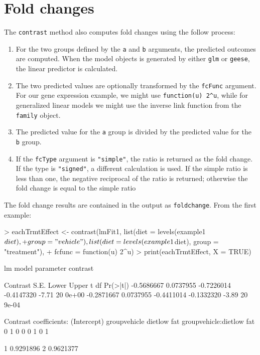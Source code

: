 \documentclass[12pt]{article}
\begin{document}
\section{Fold changes}

The \texttt{contrast} method also computes fold changes using the follow process:

\begin{enumerate}
\item For the two groups defined by the \texttt{a} and \texttt{b} arguments, the predicted outcomes are computed. When the model objects is generated by either \texttt{glm} or \texttt{geese}, the linear predictor is calculated.
\item The two predicted values are optionally transformed by the \texttt{fcFunc} argument. For our gene expression example, we might use \verb+function(u) 2^u+, while for generalized linear models we might use the inverse link function from the \texttt{family} object. 
\item The predicted value for the \texttt{a} group is divided by the predicted value for the \texttt{b} group.
\item If the \texttt{fcType} argument is \texttt{"simple"}, the ratio is returned as the fold change. If the type is \texttt{"signed"}, a different calculation is used. If the simple ratio is less than one, the negative reciprocal of the ratio is returned; otherwise the fold change is equal to the simple ratio
\end{enumerate}

The fold change results are contained in the output as \texttt{foldchange}. From the first example:

{\small
\begin{Schunk}
\begin{Sinput}
> eachTrmtEffect <- contrast(lmFit1, list(diet = levels(example1$diet), 
+     group = "vehicle"), list(diet = levels(example1$diet), group = "treatment"), 
+     fcfunc = function(u) 2^u)
> print(eachTrmtEffect, X = TRUE)
\end{Sinput}
\begin{Soutput}
lm model parameter contrast

   Contrast      S.E.      Lower      Upper     t df Pr(>|t|)
 -0.5686667 0.0737955 -0.7226014 -0.4147320 -7.71 20    0e+00
 -0.2871667 0.0737955 -0.4411014 -0.1332320 -3.89 20    9e-04

Contrast coefficients:
 (Intercept) groupvehicle dietlow fat groupvehicle:dietlow fat
           0            1           0                        0
           0            1           0                        1
\end{Soutput}
\begin{Soutput}
       [,1]
1 0.9291896
2 0.9621377
\end{Soutput}
\end{Schunk}
}
\end{document}
